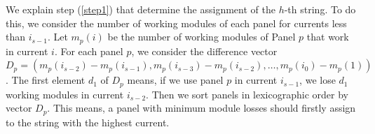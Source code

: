 \documentclass[conference]{IEEEtran}
\begin{document}
We explain step (\ref{step1}) that determine the assignment of the $h$-th string. To do this, we consider the number of working modules of each panel for currents less than $i_{s-1}$. Let $m_p(i)$ be the number of working modules of Panel $p$ that work in current $i$. For each panel $p$, we consider the difference vector $D_p=(m_p(i_{s-2})-m_p(i_{s-1}), m_p(i_{s-3})-m_p(i_{s-2}), \ldots, m_p(i_0)-m_p(1))$. The first element $d_1$ of $D_p$ means, if we use panel $p$ in current $i_{s-1}$, we lose $d_1$ working modules in current $i_{s-2}$. Then we sort panels in lexicographic order by vector $D_p$. This means, a panel with minimum module losses should firstly assign to the string with the highest current.
\end{document}
